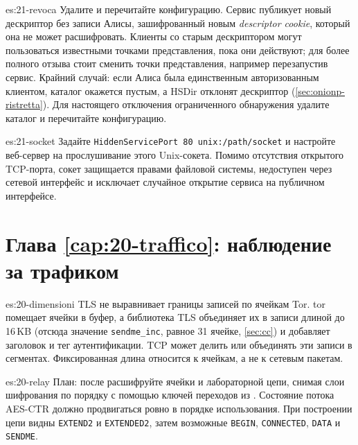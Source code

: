 \begin{soluzione}{es:21-revoca}
Удалите  и перечитайте конфигурацию. Сервис публикует новый дескриптор без записи Алисы, зашифрованный новым \emph{descriptor cookie}, который она не может расшифровать. Клиенты со старым дескриптором могут пользоваться известными точками представления, пока они действуют; для более полного отзыва стоит сменить точки представления, например перезапустив сервис. Крайний случай: если Алиса была единственным авторизованным клиентом, каталог окажется пустым, а HSDir отклонят дескриптор (\cref{sec:onionp-ristretta}). Для настоящего отключения ограниченного обнаружения удалите каталог  и перечитайте конфигурацию.
\end{soluzione}

\begin{soluzione}{es:21-socket}
Задайте \texttt{HiddenServicePort 80 unix:/path/socket} и настройте веб-сервер на прослушивание этого Unix-сокета. Помимо отсутствия открытого TCP-порта, сокет защищается правами файловой системы, недоступен через сетевой интерфейс и исключает случайное открытие сервиса на публичном интерфейсе.
\end{soluzione}

\section*{Глава \ref{cap:20-traffico}: наблюдение за трафиком}

\begin{soluzione}{es:20-dimensioni}
TLS не выравнивает границы записей по ячейкам Tor. tor помещает ячейки в буфер, а библиотека TLS объединяет их в записи длиной до 16\,KB (отсюда значение \texttt{sendme\_inc}, равное 31 ячейке, \cref{sec:cc}) и добавляет заголовок и тег аутентификации. TCP может делить или объединять эти записи в сегментах. Фиксированная длина относится к ячейкам, а не к сетевым пакетам.
\end{soluzione}

\begin{soluzione}{es:20-relay}
План: после  расшифруйте ячейки  и  лабораторной цепи, снимая слои шифрования по порядку с помощью ключей переходов из . Состояние потока AES-CTR должно продвигаться ровно в порядке использования. При построении цепи видны \texttt{EXTEND2} и \texttt{EXTENDED2}, затем возможные \texttt{BEGIN}, \texttt{CONNECTED}, \texttt{DATA} и \texttt{SENDME}.
\end{soluzione}

